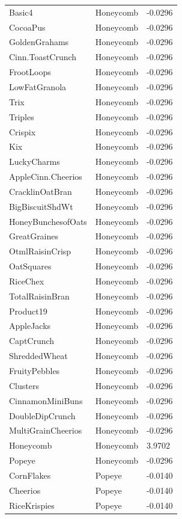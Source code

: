 \begin{table}[!htbp]
\begin{tabular}{lll}
\\
Basic4 & Honeycomb & -0.0296
\\
CocoaPus & Honeycomb & -0.0296
\\
GoldenGrahams & Honeycomb & -0.0296
\\
Cinn.ToastCrunch & Honeycomb & -0.0296
\\
FrootLoops & Honeycomb & -0.0296
\\
LowFatGranola & Honeycomb & -0.0296
\\
Trix & Honeycomb & -0.0296
\\
Triples & Honeycomb & -0.0296
\\
Crispix & Honeycomb & -0.0296
\\
Kix & Honeycomb & -0.0296
\\
LuckyCharms & Honeycomb & -0.0296
\\
AppleCinn.Cheerios & Honeycomb & -0.0296
\\
CracklinOatBran & Honeycomb & -0.0296
\\
BigBiscuitShdWt & Honeycomb & -0.0296
\\
HoneyBunchesofOats & Honeycomb & -0.0296
\\
GreatGraines & Honeycomb & -0.0296
\\
OtmlRaisinCrisp & Honeycomb & -0.0296
\\
OatSquares & Honeycomb & -0.0296
\\
RiceChex & Honeycomb & -0.0296
\\
TotalRaisinBran & Honeycomb & -0.0296
\\
Product19 & Honeycomb & -0.0296
\\
AppleJacks & Honeycomb & -0.0296
\\
CaptCrunch & Honeycomb & -0.0296
\\
ShreddedWheat & Honeycomb & -0.0296
\\
FruityPebbles & Honeycomb & -0.0296
\\
Clusters & Honeycomb & -0.0296
\\
CinnamonMiniBuns & Honeycomb & -0.0296
\\
DoubleDipCrunch & Honeycomb & -0.0296
\\
MultiGrainCheerios & Honeycomb & -0.0296
\\
Honeycomb & Honeycomb & 3.9702
\\
Popeye & Honeycomb & -0.0296
\\
CornFlakes & Popeye & -0.0140
\\
Cheerios & Popeye & -0.0140
\\
RiceKrispies & Popeye & -0.0140

\end{tabular}
\end{table}
